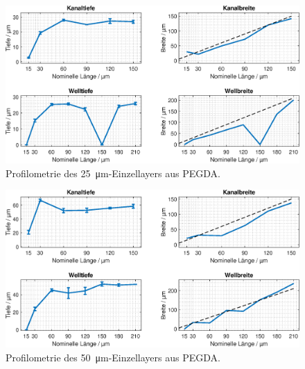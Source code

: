 \begin{figure}[!htb]
    \centering
    \includegraphics[width=\linewidth]{plot/PEGDA_25um_SL_ResolutionV1.eps}
    \caption{Profilometrie des \SI{25}{\micro\meter}-Einzellayers aus PEGDA.}
    \label{fig:PEGDA_25um}
\end{figure}

\begin{figure}[!htb]
    \centering
    \includegraphics[width=\linewidth]{plot/PEGDA_50um_SL_ResolutionV1.eps}
    \caption{Profilometrie des \SI{50}{\micro\meter}-Einzellayers aus PEGDA.}
    \label{fig:PEGDA_50um}
\end{figure}